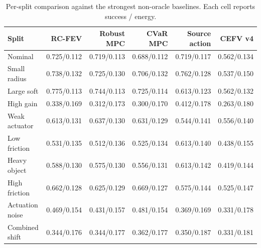 \begin{table}[t]
\centering
\scriptsize
\caption{Per-split comparison against the strongest non-oracle baselines. Each cell reports success / energy.}
\label{tab:splits}
\begin{tabular}{lrrrrr}
\toprule
Split & RC-FEV & Robust MPC & CVaR MPC & Source action & CEFV v4 \\
\midrule
Nominal & 0.725/0.112 & 0.719/0.113 & 0.688/0.112 & 0.719/0.117 & 0.562/0.134 \\
Small radius & 0.738/0.132 & 0.725/0.130 & 0.706/0.132 & 0.762/0.128 & 0.537/0.150 \\
Large soft & 0.775/0.113 & 0.744/0.113 & 0.725/0.114 & 0.613/0.123 & 0.562/0.132 \\
High gain & 0.338/0.169 & 0.312/0.173 & 0.300/0.170 & 0.412/0.178 & 0.263/0.180 \\
Weak actuator & 0.613/0.131 & 0.637/0.130 & 0.631/0.129 & 0.544/0.141 & 0.556/0.140 \\
Low friction & 0.531/0.135 & 0.512/0.136 & 0.525/0.134 & 0.613/0.140 & 0.438/0.155 \\
Heavy object & 0.588/0.130 & 0.575/0.130 & 0.556/0.131 & 0.613/0.142 & 0.419/0.144 \\
High friction & 0.662/0.128 & 0.625/0.129 & 0.669/0.127 & 0.575/0.144 & 0.525/0.147 \\
Actuation noise & 0.469/0.154 & 0.431/0.157 & 0.481/0.154 & 0.369/0.169 & 0.331/0.178 \\
Combined shift & 0.344/0.176 & 0.344/0.177 & 0.362/0.177 & 0.350/0.187 & 0.331/0.181 \\
\bottomrule
\end{tabular}
\end{table}


